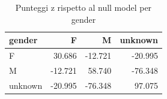 \begin{table}
\centering
\caption{Punteggi z rispetto al null model per gender}
\label{tab:t3_mixing_gender_z}
\begin{tabular}{lrrr}
\toprule
 gender &       F &       M &  unknown \\
\midrule
      F &  30.686 & -12.721 &  -20.995 \\
      M & -12.721 &  58.740 &  -76.348 \\
unknown & -20.995 & -76.348 &   97.075 \\
\bottomrule
\end{tabular}
\end{table}

